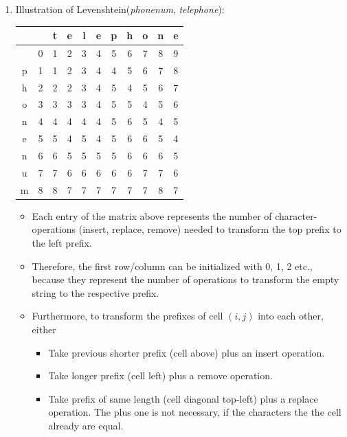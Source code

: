 \documentclass{scrartcl}
\begin{document}
\begin{enumerate}
		\item Illustration of Levenshtein(\textit{phonenum}, \textit{telephone}):
			\begin{center}
				\large
				\begin{tabular}{|c|c|c|c|c|c|c|c|c|c|c|}
					\hline
					  &   & t & e & l & e & p & h & o & n & e\\\hline
					  & 0 & 1 & 2 & 3 & 4 & 5 & 6 & 7 & 8 & 9\\\hline
					p & 1 & 1 & 2 & 3 & 4 & 4 & 5 & 6 & 7 & 8\\\hline
					h & 2 & 2 & 2 & 3 & 4 & 5 & 4 & 5 & 6 & 7\\\hline
					o & 3 & 3 & 3 & 3 & 4 & 5 & 5 & 4 & 5 & 6\\\hline
					n & 4 & 4 & 4 & 4 & 4 & 5 & 6 & 5 & 4 & 5\\\hline
					e & 5 & 5 & 4 & 5 & 4 & 5 & 6 & 6 & 5 & 4\\\hline
					n & 6 & 6 & 5 & 5 & 5 & 5 & 6 & 6 & 6 & 5\\\hline
					u & 7 & 7 & 6 & 6 & 6 & 6 & 6 & 7 & 7 & 6\\\hline
					m & 8 & 8 & 7 & 7 & 7 & 7 & 7 & 7 & 8 & 7\\\hline
				\end{tabular}
			\end{center}
		\begin{itemize}
			\item Each entry of the matrix above represents the number of character-operations (insert, replace, remove) needed to transform the top prefix to the left prefix.
			
			\item Therefore, the first row/column can be initialized with 0, 1, 2 etc., because they represent the number of operations to transform the empty string to the respective prefix.
			
			\item Furthermore, to transform the prefixes of cell $(i,j)$ into each other, either
			\begin{itemize}
				\item Take previous shorter prefix (cell above) plus an insert operation.
				\item Take longer prefix (cell left) plus a remove operation.
				\item Take prefix of same length (cell diagonal top-left) plus a replace operation. The plus one is not necessary, if the characters the the cell already are equal.
			\end{itemize}
			

\end{itemize}
\end{enumerate}
\end{document}
